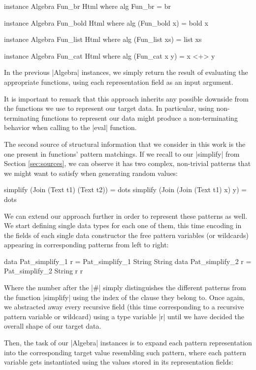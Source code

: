 \begin{code}
instance Algebra Fun_br Html where
  alg Fun_br = br

instance Algebra Fun_bold Html where
  alg (Fun_bold x) = bold x

instance Algebra Fun_list Html where
  alg (Fun_list xs) = list xs

instance Algebra Fun_cat Html where
  alg (Fun_cat x y) = x <+> y
\end{code}
%
In the previous |Algebra| instances, we simply return the result of evaluating
the appropriate functions, using each representation field as an input argument.


It is important to remark that this approach inherits any possible downside from
the functions we use to represent our target data.
%
In particular, using non-terminating functions to represent our data might
produce a non-terminating behavior when calling to the |eval| function.


%
%
The second source of structural information that we consider in this work is the
one present in functions' pattern matchings.
%
If we recall to our |simplify| from Section \ref{sec:sources}, we can observe it
has two complex, non-trivial patterns that we might want to satisfy when
generating random values:

\begin{code}
simplify (Join (Text t1) (Text t2))   = dots
simplify (Join (Join (Text t1) x) y)  = dots
\end{code}

We can extend our approach further in order to represent these patterns as well.
%
We start defining single data types for each one of them, this time encoding in
the fields of each single data constructor the free pattern variables (or
wildcards) appearing in corresponding patterns from left to right:

\begin{code}
data Pat_simplify_1 r = Pat_simplify_1 String String
data Pat_simplify_2 r = Pat_simplify_2 String r r
\end{code}
%
Where the number after the |#| simply distinguishes the different patterns from
the function |simplify| using the index of the clause they belong to.
%
Once again, we abstracted away every recursive field (this time corresponding to
a recursive pattern variable or wildcard) using a type variable |r| until we
have decided the overall shape of our target data.


Then, the task of our |Algebra| instances is to expand each pattern
representation into the corresponding target value resembling such pattern,
where each pattern variable gets instantiated using the values stored in its
representation fields:

